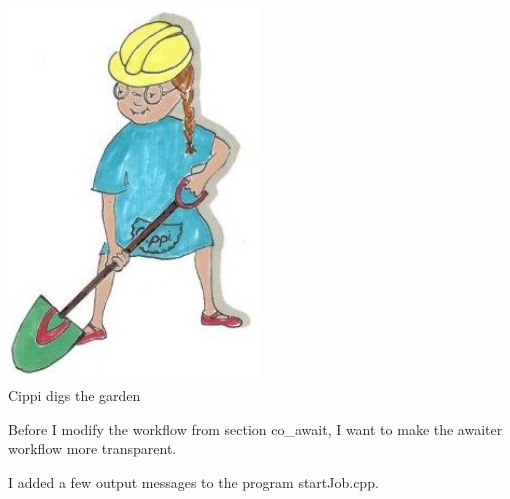 \begin{center}
\includegraphics[width=0.5\textwidth]{content/3/chapter7/images/18.png}\\
Cippi digs the garden
\end{center}

Before I modify the workflow from section co\_await, I want to make the awaiter workflow more transparent.



I added a few output messages to the program startJob.cpp.

